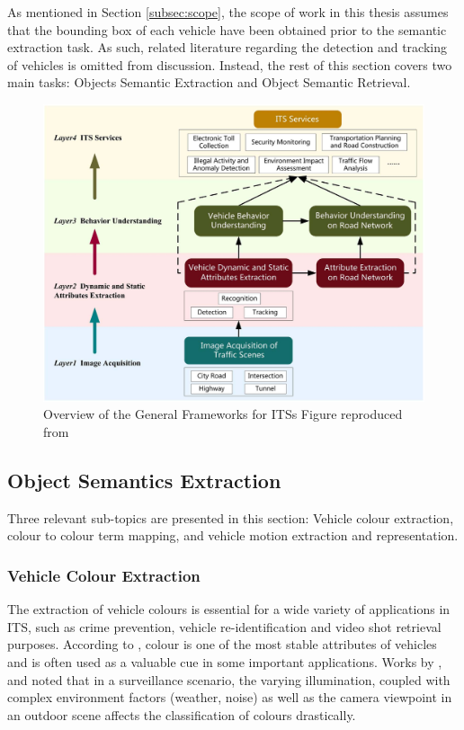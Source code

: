 As mentioned in Section \ref{subsec:scope}, the scope of work in this thesis assumes that the
bounding box of each vehicle have been obtained prior to the semantic
extraction task. As such, related literature regarding the detection and tracking of
vehicles is omitted from discussion. Instead, the rest of this section covers two main tasks: Objects Semantic Extraction and Object Semantic Retrieval.


\begin{figure}[hbt!]\centering
 \includegraphics[width=1\textwidth]{image/lit/ITS.png}
 \caption[Overview of the General Frameworks for ITSs]{Overview of the General Frameworks for ITSs 
 Figure reproduced
 from~}
 \label{fig:ITSoverview}
\end{figure}


\subsection{Object Semantics Extraction}

Three relevant sub-topics are presented in this section: Vehicle colour extraction, colour to colour term mapping, and vehicle motion extraction and representation.

\subsubsection{Vehicle Colour Extraction}
The extraction of vehicle colours is essential for a wide variety of
applications in ITS, such as crime prevention, vehicle re-identification and video shot retrieval purposes.
According to , colour is one of the
most stable attributes of vehicles and is often used as a valuable cue in some
important applications. Works by ,  and
 noted that in a surveillance scenario, the varying
illumination, coupled with complex environment factors (weather, noise) as well as the camera viewpoint in an outdoor scene affects the classification of colours drastically. 


